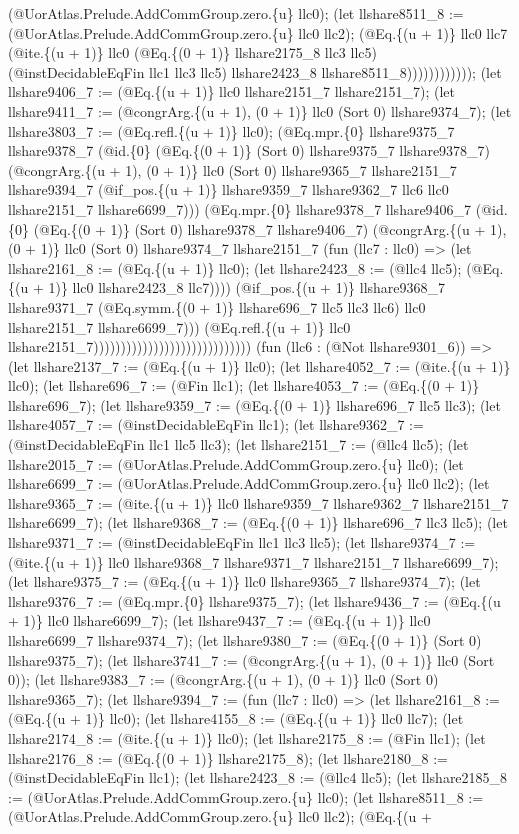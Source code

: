 \documentclass[11pt]{article}
\begin{document}
(@UorAtlas.Prelude.AddCommGroup.zero.\{u\} llc0); (let llshare8511\_8 := (@UorAtlas.Prelude.AddCommGroup.zero.\{u\} llc0 llc2); (@Eq.\{(u + 1)\} llc0 llc7 (@ite.\{(u + 1)\} llc0 (@Eq.\{(0 + 1)\} llshare2175\_8 llc3 llc5) (@instDecidableEqFin llc1 llc3 llc5) llshare2423\_8 llshare8511\_8)))))))))))); (let llshare9406\_7 := (@Eq.\{(u + 1)\} llc0 llshare2151\_7 llshare2151\_7); (let llshare9411\_7 := (@congrArg.\{(u + 1), (0 + 1)\} llc0 (Sort 0) llshare9374\_7); (let llshare3803\_7 := (@Eq.refl.\{(u + 1)\} llc0); (@Eq.mpr.\{0\} llshare9375\_7 llshare9378\_7 (@id.\{0\} (@Eq.\{(0 + 1)\} (Sort 0) llshare9375\_7 llshare9378\_7) (@congrArg.\{(u + 1), (0 + 1)\} llc0 (Sort 0) llshare9365\_7 llshare2151\_7 llshare9394\_7 (@if\_pos.\{(u + 1)\} llshare9359\_7 llshare9362\_7 llc6 llc0 llshare2151\_7 llshare6699\_7))) (@Eq.mpr.\{0\} llshare9378\_7 llshare9406\_7 (@id.\{0\} (@Eq.\{(0 + 1)\} (Sort 0) llshare9378\_7 llshare9406\_7) (@congrArg.\{(u + 1), (0 + 1)\} llc0 (Sort 0) llshare9374\_7 llshare2151\_7 (fun (llc7 : llc0) => (let llshare2161\_8 := (@Eq.\{(u + 1)\} llc0); (let llshare2423\_8 := (@llc4 llc5); (@Eq.\{(u + 1)\} llc0 llshare2423\_8 llc7)))) (@if\_pos.\{(u + 1)\} llshare9368\_7 llshare9371\_7 (@Eq.symm.\{(0 + 1)\} llshare696\_7 llc5 llc3 llc6) llc0 llshare2151\_7 llshare6699\_7))) (@Eq.refl.\{(u + 1)\} llc0 llshare2151\_7))))))))))))))))))))))))))))) (fun (llc6 : (@Not llshare9301\_6)) => (let llshare2137\_7 := (@Eq.\{(u + 1)\} llc0); (let llshare4052\_7 := (@ite.\{(u + 1)\} llc0); (let llshare696\_7 := (@Fin llc1); (let llshare4053\_7 := (@Eq.\{(0 + 1)\} llshare696\_7); (let llshare9359\_7 := (@Eq.\{(0 + 1)\} llshare696\_7 llc5 llc3); (let llshare4057\_7 := (@instDecidableEqFin llc1); (let llshare9362\_7 := (@instDecidableEqFin llc1 llc5 llc3); (let llshare2151\_7 := (@llc4 llc5); (let llshare2015\_7 := (@UorAtlas.Prelude.AddCommGroup.zero.\{u\} llc0); (let llshare6699\_7 := (@UorAtlas.Prelude.AddCommGroup.zero.\{u\} llc0 llc2); (let llshare9365\_7 := (@ite.\{(u + 1)\} llc0 llshare9359\_7 llshare9362\_7 llshare2151\_7 llshare6699\_7); (let llshare9368\_7 := (@Eq.\{(0 + 1)\} llshare696\_7 llc3 llc5); (let llshare9371\_7 := (@instDecidableEqFin llc1 llc3 llc5); (let llshare9374\_7 := (@ite.\{(u + 1)\} llc0 llshare9368\_7 llshare9371\_7 llshare2151\_7 llshare6699\_7); (let llshare9375\_7 := (@Eq.\{(u + 1)\} llc0 llshare9365\_7 llshare9374\_7); (let llshare9376\_7 := (@Eq.mpr.\{0\} llshare9375\_7); (let llshare9436\_7 := (@Eq.\{(u + 1)\} llc0 llshare6699\_7); (let llshare9437\_7 := (@Eq.\{(u + 1)\} llc0 llshare6699\_7 llshare9374\_7); (let llshare9380\_7 := (@Eq.\{(0 + 1)\} (Sort 0) llshare9375\_7); (let llshare3741\_7 := (@congrArg.\{(u + 1), (0 + 1)\} llc0 (Sort 0)); (let llshare9383\_7 := (@congrArg.\{(u + 1), (0 + 1)\} llc0 (Sort 0) llshare9365\_7); (let llshare9394\_7 := (fun (llc7 : llc0) => (let llshare2161\_8 := (@Eq.\{(u + 1)\} llc0); (let llshare4155\_8 := (@Eq.\{(u + 1)\} llc0 llc7); (let llshare2174\_8 := (@ite.\{(u + 1)\} llc0); (let llshare2175\_8 := (@Fin llc1); (let llshare2176\_8 := (@Eq.\{(0 + 1)\} llshare2175\_8); (let llshare2180\_8 := (@instDecidableEqFin llc1); (let llshare2423\_8 := (@llc4 llc5); (let llshare2185\_8 := (@UorAtlas.Prelude.AddCommGroup.zero.\{u\} llc0); (let llshare8511\_8 := (@UorAtlas.Prelude.AddCommGroup.zero.\{u\} llc0 llc2); (@Eq.\{(u + 
\end{document}
